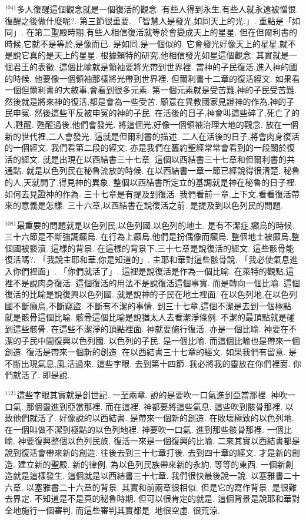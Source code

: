 \documentclass{book}
\begin{document}
$^{1041}$多人復醒這個觀念就是一個復活的觀念.
有些人得到永生,有些人就永遠被憎恨.
復醒之後做什麼呢?.
第三節很重要.
「智慧人是發光,如同天上的光.」.
重點是「如同」.
在第二聖殿時期,有些人相信復活就等於會變成天上的星星.
但在但爾利書的時候,它就不是等於,是像而已.
是如同,是一個似的.
它會發光好像天上的星星,就不是說它真的是天上的星星.
根據賴特的研究,他相信發光如星這個觀念.
其實就是一個君王的表徵.
這個比喻就是領袖要將光帶到世界裡.
當神的子民復活,進入神的國的時候.
他要像一個領袖那樣將光帶到世界裡.
但爾利書十二章的復活經文.
如果看一個但爾利書的大敘事,會看到很多元素.
第一個元素就是受苦難,神的子民受苦難.
然後就是將來神的復活,都是會為一些受苦.
願意在異教國家見證神的作為,神的子民申冤.
然後這些平反被申冤的神的子民.
在活後的日子,神會叫這些碎了,死亡了的人,甦醒.
甦醒過後,他們會發光.
將這個光,好像一個領袖治理大地的觀念.
放在一個新的世代裡,二人會發光.
這就是但爾利書的描述.
二人在活後的日子,將會肉身復活的一個經文.
我們看第二段的經文.
亦是我們在舊約聖經常常會看到的一段關於復活的經文.
就是出現在以西結書三十七章.
這個以西結書三十七章和但爾利書的共通點.
就是以色列民在秘魯流放的時候.
在以西結書一章一節已經說得很清楚.
秘魯的人,天就開了,得見神的異象.
整個以西結書所定立的基調就是神在秘魯的日子裡.
如何去見證神的作為.
三十七章是有提及到復活.
我們看前一章,上下文,看看復活帶來的意義是怎樣.
三十六章,以西結書在說復活之前.
是提及到以色列民的問題.

$^{1081}$最重要的問題就是以色列民,以色列國,以色列的地土.
是有不潔症,癲烏的時候.
三十六節是不斷強調癲烏.
在行為上癲烏,他們是扮偶像而癲烏.
整個地土被癲烏,整個國被褻瀆.
這樣的背景.
在這樣的背景下,三十七章是說復活的經文.
這些骸骨能復活嗎?.
「我說主耶和華,你是知道的」.
主耶和華對這些骸骨說.
「我必使氣息進入你們裡面」.
「你們就活了」.
這裡是說復活是作為一個比喻.
在萊特的觀點,這裡不是說肉身復活.
這個復活的用法不是說復活這個事實.
而是轉向一個比喻.
這個復活的比喻是說復興以色列國.
就是說神的子民在地土裡面.
在以色列地,在以色列國不斷癲烏,不斷竊盜.
不斷有不潔的事情.
到三十七章,這個不潔是去到一個極點.
就是骸骨這個比喻.
骸骨這個比喻是說猶太人去看潔淨條例.
不潔的最頂點就是碰到這些骸骨.
在這些不潔淨的頂點裡面.
神就要施行復活.
亦是一個比喻.
神要在不潔的子民中間復興以色列國.
以色列的子民.
是一個比喻.
而這個比喻也是帶來一個創造.
復活是帶來一個新的創造.
在以西結書三十七章的經文.
如果我們有留意.
是不斷出現氣息,風,活過來.
這些字眼.
去到第十四節.
我必將我的靈放在你們裡面.
你們就活了.
即是說.

$^{1121}$這些字眼其實就是創世記.
一至兩章.
說的是要吹一口氣進到亞當那裡.
神吹一口氣.
那個靈進到亞當那裡.
而在這裡.
神都要將這些氣息.
這些吹到骸骨那裡.
以致他們就活了.
好像說的以西結書.
是帶來一個新的創造.
在敗壞極致的以色列地.
在一個叫做不潔到極點的以色列地裡.
神要吹一口氣.
進到那些骸骨那裡.
一個比喻.
神要復興整個以色列民族.
復活一來是一個復興的比喻.
二來其實以西結書都是說到復活會帶來新的創造.
往後去到三十七章打後.
去到四十章的經文.
才是新的創造.
建立新的聖殿.
新的律例.
為以色列民族帶來新的永約.
等等的東西.
一個新創造就是這樣發生.
這個就是以西結書三十七章.
我們很快最後說一說.
以塞雅書二十六章.
以塞雅書二十六章的背景.
其實和前兩章很相似.
但是它的寫作背景.
是很難去界定.
不知道是不是真的秘魯時期.
但可以很肯定的就是.
這個背景是說耶和華對全地施行一個審判.
而這些審判其實都是.
地很空虛.
很荒涼.
\end{document}
